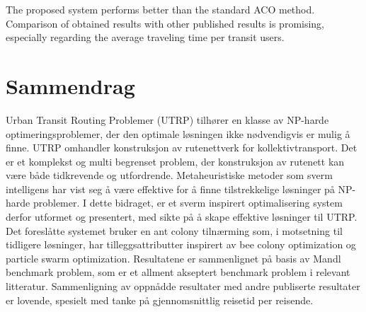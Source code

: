 The proposed system performs better than the standard ACO method. Comparison of obtained results with other published results is promising, especially regarding the average traveling time per transit users. 

\section*{Sammendrag}

Urban Transit Routing Problemer (UTRP) tilhører en klasse av NP-harde optimeringsproblemer, der den optimale løsningen ikke nødvendigvis er mulig å finne. UTRP omhandler konstruksjon av rutenettverk for kollektivtransport. Det er et komplekst og multi begrenset problem, der konstruksjon av rutenett kan være både tidkrevende og utfordrende. Metaheuristiske metoder som sverm intelligens har vist seg å være effektive for å finne tilstrekkelige løsninger på NP-harde problemer. I dette bidraget, er et sverm inspirert optimalisering system derfor utformet og presentert, med sikte på å skape effektive løsninger til UTRP. Det foreslåtte systemet bruker en ant colony tilnærming som, i motsetning til tidligere løsninger, har tilleggsattributter inspirert av bee colony optimization og particle swarm optimization. Resultatene er sammenlignet på basis av Mandl benchmark problem, som er et allment akseptert benchmark problem i  relevant litteratur. Sammenligning av oppnådde resultater med andre publiserte resultater er lovende, spesielt med tanke på gjennomsnittlig reisetid per reisende.
